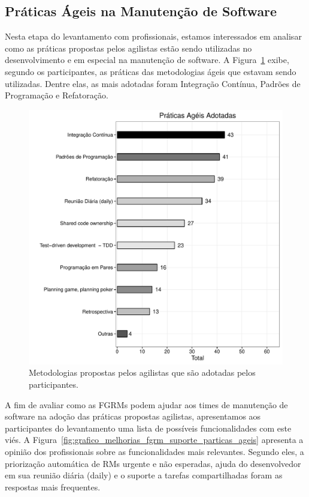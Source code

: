 \subsection{Práticas Ágeis na Manutenção de Software}
\label{sub:práticas_ágeis_na_manutenção_de_software}

Nesta etapa do levantamento com profissionais, estamos interessados em analisar
como as práticas propostas pelos agilistas estão sendo utilizadas no
desenvolvimento e em especial na manutenção de software. A
Figura~\ref{fig:grafico_melhorias_fgrm_praticas_ageis_adotadas} exibe, segundo
os participantes, as práticas das metodologias ágeis que estavam sendo
utilizadas. Dentre elas, as mais adotadas foram Integração Contínua, Padrões de
Programação e Refatoração.

\begin{figure}[htpb]
	\centering
	\includegraphics[width=0.8\linewidth]{./chapter-pesquisa-com-profissionais/img/grafico_melhorias_fgrm_praticas_ageis_adotadas.pdf}
	\caption{Metodologias propostas pelos agilistas que são adotadas pelos
		participantes.}
\label{fig:grafico_melhorias_fgrm_praticas_ageis_adotadas}
\end{figure}

A fim de avaliar como as FGRMs podem ajudar aos times de manutenção de software
na adoção das práticas propostas agilistas, apresentamos aos participantes do
levantamento uma lista de possíveis funcionalidades com este viés. A
Figura~\ref{fig:grafico_melhorias_fgrm_suporte_particas_ageis} apresenta a
opinião dos profissionais sobre as funcionalidades mais relevantes. Segundo
eles, a priorização automática de RMs urgente e não esperadas, ajuda do
desenvolvedor em sua reunião diária (daily) e o suporte a tarefas compartilhadas
foram as respostas mais frequentes.

